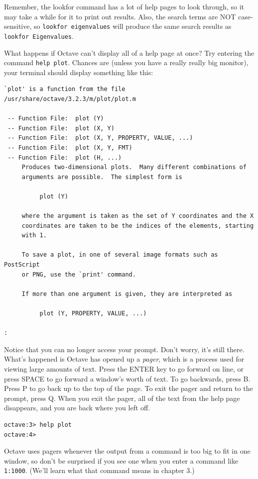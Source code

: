 \documentclass{book}
\begin{document}
Remember, the lookfor command has a lot of help pages to look through, so it
may take a while for it to print out results. Also, the search
terms are NOT case-sensitive, so {\tt lookfor eigenvalues} will produce the
same search results as {\tt lookfor Eigenvalues}.

What happens if Octave can't display all of a help page at once? Try entering
the command {\tt help plot}. Chances are (unless you have a really really big
monitor), your terminal should display something like this:

\begin{verbatim}
`plot' is a function from the file /usr/share/octave/3.2.3/m/plot/plot.m

 -- Function File:  plot (Y)
 -- Function File:  plot (X, Y)
 -- Function File:  plot (X, Y, PROPERTY, VALUE, ...)
 -- Function File:  plot (X, Y, FMT)
 -- Function File:  plot (H, ...)
     Produces two-dimensional plots.  Many different combinations of
     arguments are possible.  The simplest form is

          plot (Y)

     where the argument is taken as the set of Y coordinates and the X
     coordinates are taken to be the indices of the elements, starting
     with 1.

     To save a plot, in one of several image formats such as PostScript
     or PNG, use the `print' command.

     If more than one argument is given, they are interpreted as

          plot (Y, PROPERTY, VALUE, ...)

:
\end{verbatim}

Notice that you can no longer access your prompt. Don't worry, it's still there.
What's happened is Octave has opened up a {\it pager}, which is a process used
for viewing large amounts of text. Press the ENTER key to go forward on
line, or press SPACE to go forward a window's worth of text. To go
backwards, press B. Press P to go back up to the top of the page.
To exit the pager and return to the prompt, press Q. When you exit the pager,
all of the text from the help page disappears, and you are back where you left
off.

\begin{verbatim}
octave:3> help plot
octave:4>
\end{verbatim}

Octave uses pagers whenever the output from a command is too big to fit in one
window, so don't be surprised if you see one when you enter a command like {\tt
1:1000}. (We'll learn what that command means in chapter 3.)
\end{document}
